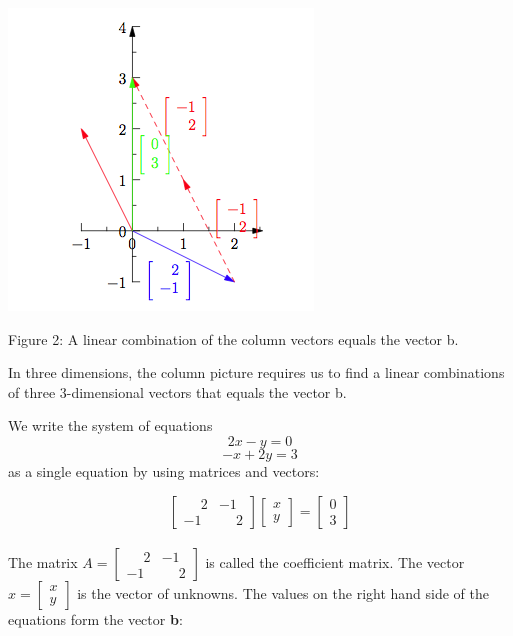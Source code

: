\documentclass{ximera}
\begin{document}
\begin{center}
\includegraphics{Geometry2.png}

Figure 2: A linear combination of the column vectors equals the vector b.

\end{center}

\noindent
In three dimensions, the column picture requires us to find a linear combinations of three 3-dimensional vectors that equals the vector b.

\noindent
We write the system of equations
\[2x-y = 0\]
\[-x+2y = 3\]
as a single equation by using matrices and vectors:

\[\begin{bmatrix} \phantom{-}2 & -1\\ -1 & \phantom{-}2 \end{bmatrix} \begin{bmatrix} x\\y \end{bmatrix} =  \begin{bmatrix} 0\\3 \end{bmatrix}\]\\

\noindent
The matrix $A = \begin{bmatrix} \phantom{-}2 & -1\\-1 & \phantom{-}2 \end{bmatrix}$ is called the coefficient matrix. The vector $x = \begin{bmatrix} x\\y \end{bmatrix}$ is the vector of unknowns. The values on the right hand side of the
equations form the vector \textbf{b}:
\end{document}
